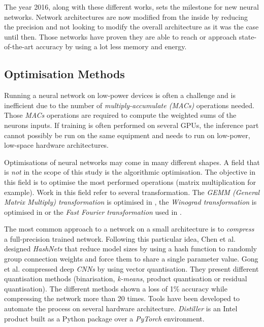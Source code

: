 The year 2016, along with these different works, sets the milestone for new neural networks. Network architectures are now modified from the inside by reducing the precision and not looking to modify the overall architecture as it was the case until then. Those networks have proven they are able to reach or approach state-of-the-art accuracy by using a lot less memory and energy.


\subsection{Optimisation Methods}

Running a neural network on low-power devices is often a challenge and is inefficient due to the number of \emph{multiply-accumulate (MACs)} operations needed. Those \emph{MACs} operations are required to compute the weighted sums of the neurons inputs. If training is often performed on several GPUs, the inference part cannot possibly be run on the same equipment and needs to run on low-power, low-space hardware architectures.

Optimisations of neural networks may come in many different shapes. A field that is \emph{not} in the scope of this study is the algorithmic optimisation. The objective in this field is to optimise the most performed operations (matrix multiplication for example). Work in this field refer to several transformation. The \emph{GEMM (General Matrix Multiply) transformation} is optimised in \cite{Cong2014, Chellapilla2006}, the \emph{Winograd transformation} is optimised in \cite{Aydonat2017} or the \emph{Fast Fourier transformation} used in \cite{Ko2017}.

The most common approach to  a network on a small architecture is to \emph{compress} a full-precision trained network. Following this particular idea, Chen et al. \cite{Chen2015} designed \emph{HashNets} that reduce model sizes by using a hash function to randomly group connection weights and force them to share a single parameter value.  Gong et al. \cite{Gong2014} compressed deep \emph{CNNs} by using vector quantisation. They present different quantisation methods (binarisation, \emph{k-means}, product quantisation or residual quantisation). The different methods shown a loss of 1\% accuracy while compressing the network more than 20 times. Tools have been developed to automate the process on several hardware architecture. \emph{Distiller} \cite{Nzmora2019} is an Intel product built as a Python package over a \emph{PyTorch} environment.


